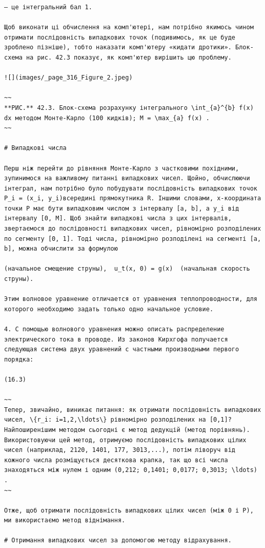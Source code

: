 \documentclass[
  ukrainian,
]{article}
\begin{document}
\begin{verbatim}
— це інтегральний бал 1.

Щоб виконати ці обчислення на комп'ютері, нам потрібно якимось чином отримати послідовність випадкових точок (подивимось, як це буде зроблено пізніше), тобто наказати комп'ютеру «кидати дротики». Блок-схема на рис. 42.3 показує, як комп'ютер вирішить цю проблему.

![](images/_page_316_Figure_2.jpeg)

~~
**РИС.** 42.3. Блок-схема розрахунку інтегрального \int_{a}^{b} f(x) dx методом Монте-Карло (100 кидків); M = \max_{a} f(x) .
~~

# Випадкові числа

Перш ніж перейти до рівняння Монте-Карло з частковими похідними, зупинимося на важливому питанні випадкових чисел. Щойно, обчислюючи інтеграл, нам потрібно було побудувати послідовність випадкових точок P_i = (x_i, y_i)всередині прямокутника R. Іншими словами, x-координата точки P має бути випадковим числом з інтервалу [a, b], а y_i від інтервалу [0, M]. Щоб знайти випадкові числа з цих інтервалів, звертаємося до послідовності випадкових чисел, рівномірно розподілених по сегменту [0, 1]. Тоді числа, рівномірно розподілені на сегменті [a, b], можна обчислити за формулою

(начальное смещение струны),  u_t(x, 0) = g(x)  (начальная скорость струны).

Этим волновое уравнение отличается от уравнения теплопроводности, для которого необходимо задать только одно начальное условие.

4. С помощью волнового уравнения можно описать распределение электрического тока в проводе. Из законов Кирхгофа получается следующая система двух уравнений с частными производными первого порядка:

(16.3)

~~
Тепер, звичайно, виникає питання: як отримати послідовність випадкових чисел, \{r_i: i=1,2,\ldots\} рівномірно розподілених на [0,1]? Найпоширенішим методом сьогодні є метод дедукцій (метод порівнянь). Використовуючи цей метод, отримуємо послідовність випадкових цілих чисел (наприклад, 2120, 1401, 177, 3013,...), потім ліворуч від кожного числа розміщується десяткова крапка, так що всі числа знаходяться між нулем і одним (0,212; 0,1401; 0,0177; 0,3013; \ldots) .
~~

Отже, щоб отримати послідовність випадкових цілих чисел (між 0 і P), ми використаємо метод віднімання.

# Отримання випадкових чисел за допомогою методу відрахування.


\end{verbatim}
\end{document}
